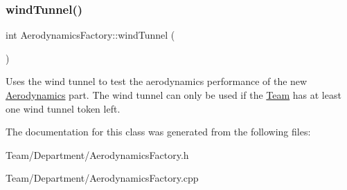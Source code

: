 \subsubsection{\texorpdfstring{wind\+Tunnel()}{windTunnel()}}
{\footnotesize\ttfamily int Aerodynamics\+Factory\+::wind\+Tunnel (\begin{DoxyParamCaption}{ }\end{DoxyParamCaption})\hspace{0.3cm}{\ttfamily [private]}}

Uses the wind tunnel to test the aerodynamics performance of the new \hyperlink{classAerodynamics}{Aerodynamics} part. The wind tunnel can only be used if the \hyperlink{classTeam}{Team} has at least one wind tunnel token left. 

The documentation for this class was generated from the following files\+:\begin{DoxyCompactItemize}
\item 
Team/\+Department/Aerodynamics\+Factory.\+h\item 
Team/\+Department/Aerodynamics\+Factory.\+cpp\end{DoxyCompactItemize}
